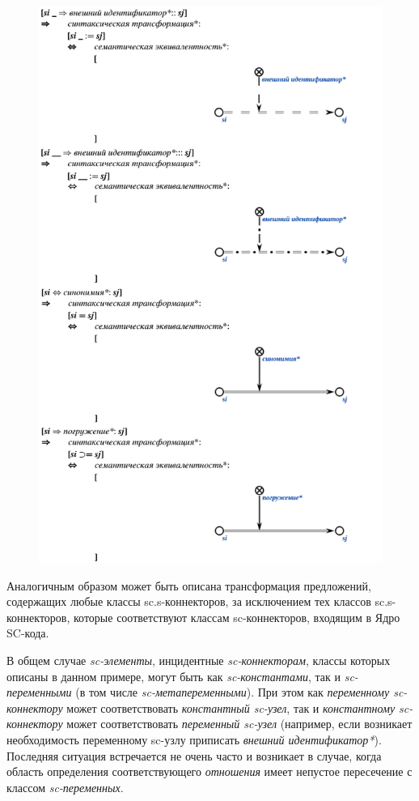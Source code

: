 \newpage
\begin{figure}[h]
	\includegraphics[scale=0.5]{images/intro/scs/sc.s-connectors/examples/example_4.png}
\end{figure}

Аналогичным образом может быть описана трансформация предложений, содержащих любые классы sc.s-коннекторов, за исключением тех классов sc.s-коннекторов, которые соответствуют классам sc-коннекторов, входящим в Ядро SC-кода.

В общем случае \textit{sc-элементы}, инцидентные \textit{sc-коннекторам}, классы которых описаны в данном примере, могут быть как \textit{sc-константами}, так и \textit{sc-переменными} (в том числе \textit{sc-метапеременными}). При этом как \textit{переменному sc-коннектору} может соответствовать \textit{константный sc-узел}, так и \textit{константному sc-коннектору} может соответствовать \textit{переменный sc-узел} (например, если возникает необходимость переменному sc-узлу приписать \textit{внешний идентификатор*}). Последняя ситуация встречается не очень часто и возникает в случае, когда область определения соответствующего \textit{отношения} имеет непустое пересечение с классом \textit{sc-переменных}.

